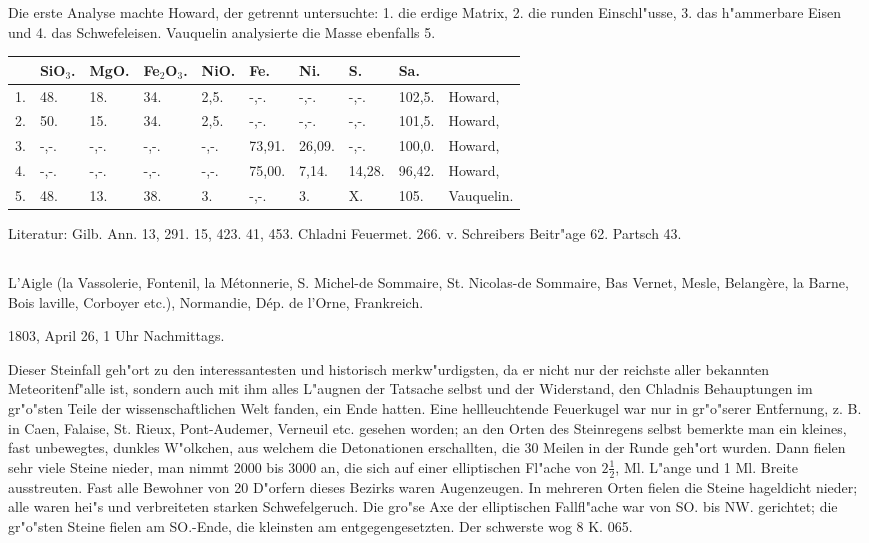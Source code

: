 \documentclass[a4paper, 11pt, oneside]{article}
\begin{document}
Die erste Analyse machte Howard, der getrennt untersuchte: 1. die erdige Matrix, 2. die runden Einschl"usse, 3. das h"ammerbare Eisen und 4. das Schwefeleisen. Vauquelin analysierte die Masse ebenfalls 5.
\begin{table}[!ht]
    \centering\swabfamily\Large
    \normalsize
    \begin{tabular}{l l l l l l l l l l}
         & SiO$_{3}$. & MgO. & Fe$_{2}$O$_{3}$. & NiO. & Fe. & Ni. & S. & Sa. &  \\ \hline
        1. & 48. & 18. & 34. & 2,5. & -,-. & -,-. & -,-. & 102,5. & Howard, \\
        2. & 50. & 15. & 34. & 2,5. & -,-. & -,-. & -,-. & 101,5. & Howard, \\
        3. & -,-. & -,-. & -,-. & -,-. & 73,91. & 26,09. & -,-. & 100,0. & Howard, \\
        4. & -,-. & -,-. & -,-. & -,-. & 75,00. & 7,14. & 14,28. & 96,42. & Howard, \\
        5. & 48. & 13. & 38. & 3. & -,-. & 3. & X. & 105. & Vauquelin. \\
    \end{tabular}
\end{table}

\normalsize
Literatur: Gilb. Ann. 13, 291. 15, 423. 41, 453. Chladni Feuermet. 266. v. Schreibers Beitr"age 62. Partsch 43.
\subsection{}
\LARGE
\paragraph{}
L'Aigle (la Vassolerie, Fontenil, la Métonnerie, S. Michel-de Sommaire, St. Nicolas-de Sommaire, Bas Vernet, Mesle, Belangère, la Barne, Bois laville, Corboyer etc.), Normandie, Dép. de l'Orne, Frankreich.

1803, April 26, 1 Uhr Nachmittags.

Dieser Steinfall geh"ort zu den interessantesten und historisch merkw"urdigsten, da er nicht nur der reichste aller bekannten Meteoritenf"alle ist, sondern auch mit ihm alles L"augnen der Tatsache selbst und der Widerstand, den Chladnis Behauptungen im gr"o"sten Teile der wissenschaftlichen Welt fanden, ein Ende hatten. Eine hellleuchtende Feuerkugel war nur in gr"o"serer Entfernung, z. B. in Caen, Falaise, St. Rieux, Pont-Audemer, Verneuil etc. gesehen worden; an den Orten des Steinregens selbst bemerkte man ein kleines, fast unbewegtes, dunkles W"olkchen, aus welchem die Detonationen erschallten, die 30 Meilen in der Runde geh"ort wurden. Dann fielen sehr viele Steine nieder, man nimmt 2000 bis 3000 an, die sich auf einer elliptischen Fl"ache von $\mathfrak{2\frac{1}{2}}$, Ml. L"ange und 1 Ml. Breite ausstreuten. Fast alle Bewohner von 20 D"orfern dieses Bezirks waren Augenzeugen. In mehreren Orten fielen die Steine hageldicht nieder; alle waren hei"s und verbreiteten starken Schwefelgeruch. Die gro"se Axe der elliptischen Fallfl"ache war von SO. bis NW. gerichtet; die gr"o"sten Steine fielen am SO.-Ende, die kleinsten am entgegengesetzten. Der schwerste wog 8 K. 065.
\end{document}
